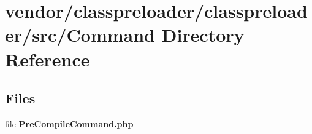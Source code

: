 \section{vendor/classpreloader/classpreloader/src/\+Command Directory Reference}
\label{dir_de731f67d4645a8a3a638fa0ade22b51}
\subsection*{Files}
\begin{DoxyCompactItemize}
\item 
file {\bf Pre\+Compile\+Command.\+php}
\end{DoxyCompactItemize}
